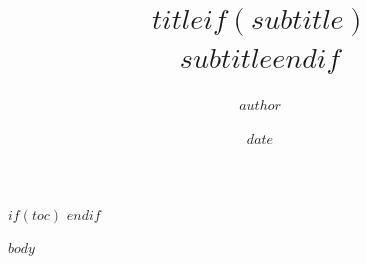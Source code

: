 \documentclass[$if(fontsize)$$fontsize$,$endif$$if(papersize)$$papersize$,$endif$$for(classoption)$$classoption$$sep$,$endfor$]{$documentclass$}
\title{$title$$if(subtitle)$\\[0.6em]{\large $subtitle$}$endif$}
\author{$author$}
\date{$date$}
\begin{document}
\maketitle
\thispagestyle{empty}
\clearpage

$if(toc)$
\tableofcontents
\clearpage
$endif$

$body$
\end{document}
